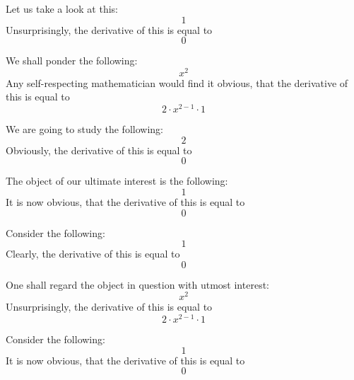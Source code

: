 \documentclass{article}
\begin{document}
Let us take a look at this:
\begin{equation}
1 
\end{equation}
Unsurprisingly, the derivative of this is equal to
\begin{equation}
0 
\end{equation}

We shall ponder the following:
\begin{equation}
x ^{2 } 
\end{equation}
Any self-respecting mathematician would find it obvious, that the derivative of this is equal to
\begin{equation}
2 \cdot x ^{2 - 1 } \cdot 1 
\end{equation}

We are going to study the following:
\begin{equation}
2 
\end{equation}
Obviously, the derivative of this is equal to
\begin{equation}
0 
\end{equation}

The object of our ultimate interest is the following:
\begin{equation}
1 
\end{equation}
It is now obvious, that the derivative of this is equal to
\begin{equation}
0 
\end{equation}

Consider the following:
\begin{equation}
1 
\end{equation}
Clearly, the derivative of this is equal to
\begin{equation}
0 
\end{equation}

One shall regard the object in question with utmost interest:
\begin{equation}
x ^{2 } 
\end{equation}
Unsurprisingly, the derivative of this is equal to
\begin{equation}
2 \cdot x ^{2 - 1 } \cdot 1 
\end{equation}

Consider the following:
\begin{equation}
1 
\end{equation}
It is now obvious, that the derivative of this is equal to
\begin{equation}
0 
\end{equation}
\end{document}

